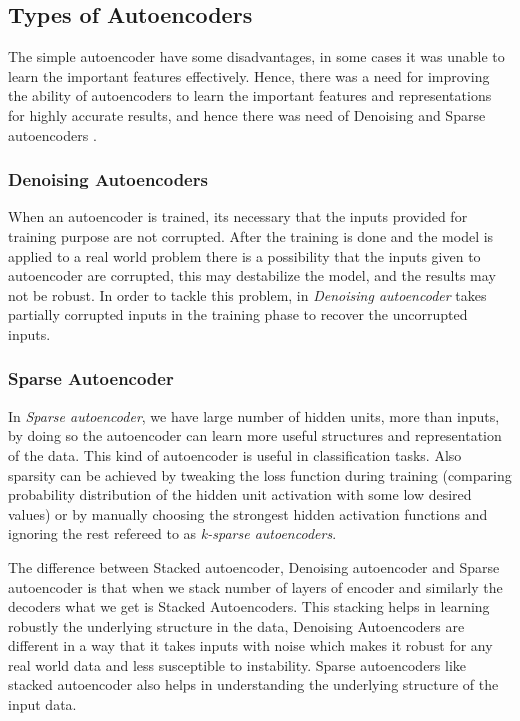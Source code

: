 \documentclass[12pt, a4paper]{report}
\begin{document}
\subsection{Types of Autoencoders}\label{sec:types_autoencoder}

The simple autoencoder have some disadvantages, in some cases it was unable to learn the important features effectively. Hence, there was a need for improving the ability of autoencoders to learn the important features and representations for highly accurate results, and hence there was need of Denoising and Sparse autoencoders .\\ \par

\subsubsection{Denoising Autoencoders}\label{sec:denoising_autoencoder}

When an autoencoder is trained, its necessary that the inputs provided for training purpose are not corrupted. After the training is done and the model is applied to a real world problem there is a possibility that the inputs given to autoencoder are corrupted, this may destabilize the model, and the results may not be robust. In order to tackle this problem, in \textit{Denoising autoencoder} takes partially corrupted inputs in the training phase to recover the uncorrupted inputs.\\ \par

\subsubsection{Sparse Autoencoder}\label{sec:sparse_autoencoder}

In \textit{Sparse autoencoder}, we have large number of hidden units, more than inputs, by doing so the autoencoder can learn more useful structures and representation of the data. This kind of autoencoder is useful in classification tasks. Also sparsity can be achieved by tweaking the loss function during training (comparing probability distribution of the hidden unit activation with some low desired values) or by manually choosing the strongest hidden activation functions and ignoring the rest refereed to as \textit{k-sparse autoencoders}\cite{ksparseautoencoder}.\\ \par

The difference between Stacked autoencoder, Denoising autoencoder and Sparse autoencoder is that when we stack number of layers of encoder and similarly the decoders what we get is Stacked Autoencoders. This stacking helps in learning robustly the underlying structure in the data, Denoising Autoencoders are different in a way that it takes inputs with noise which makes it robust for any real world data and less susceptible to instability. Sparse autoencoders like stacked autoencoder also helps in understanding the underlying structure of the input data.
\end{document}
